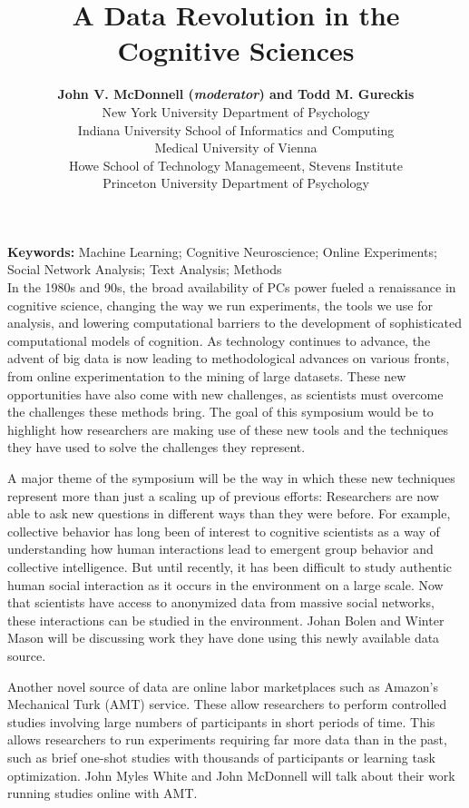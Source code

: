 \documentclass[10pt,letterpaper]{article}
\title{A Data Revolution in the Cognitive Sciences}
\author{{\large \bf John V. McDonnell (\emph{moderator}) and Todd M. Gureckis}  \\
  New York University Department of Psychology
  \AND {\large \bf Johan Bolen} \\
  Indiana University School of Informatics and Computing
  \AND {\large \bf Georg Langs} \\
  Medical University of Vienna
  \AND {\large \bf Winter Mason, Meeyoung Cha, Krishna Gummadi, Farshad Kooti, and Haeryun Yang} \\
  Howe School of Technology Managemeent, Stevens Institute 
  \AND {\large \bf John Myles White} \\
  Princeton University Department of Psychology }
\begin{document}
\maketitle


\textbf{Keywords:} 
Machine Learning; Cognitive Neuroscience; Online Experiments; Social Network
Analysis; Text Analysis; Methods\\

In the 1980s and 90s, the broad availability of PCs power fueled a renaissance in
cognitive science, changing the way we run experiments, the tools we use for
analysis, and lowering computational barriers to the development of sophisticated
computational models of cognition. As technology continues to advance, the advent
of big data is now leading to methodological advances on various fronts, from
online experimentation to the mining of large datasets. These new opportunities
have also come with new challenges, as scientists must overcome the challenges
these methods bring. The goal of this symposium would be to highlight how
researchers are making use of these new tools and the techniques they have used
to solve the challenges they represent. 

A major theme of the symposium will be the way in which these new techniques
represent more than just a scaling up of previous efforts: Researchers are now
able to ask new questions in different ways than they were before. For example,
collective behavior has long been of interest to cognitive scientists as a way of
understanding how human interactions lead to emergent group behavior and
collective intelligence. But until recently, it has been difficult to study
authentic human social interaction as it occurs in the environment on a large
scale. Now that scientists have access to anonymized data from massive social
networks, these interactions can be studied in the environment. Johan Bolen and
Winter Mason will be discussing work they have done using this newly available
data source.

Another novel source of data are online labor marketplaces such as Amazon's
Mechanical Turk (AMT) service. These allow researchers to perform controlled
studies involving large numbers of participants in short periods of time. This
allows researchers to run experiments requiring far more data than in the past,
such as brief one-shot studies with thousands of participants or learning task
optimization. John Myles White and John McDonnell will talk about their work
running studies online with AMT.
\end{document}
